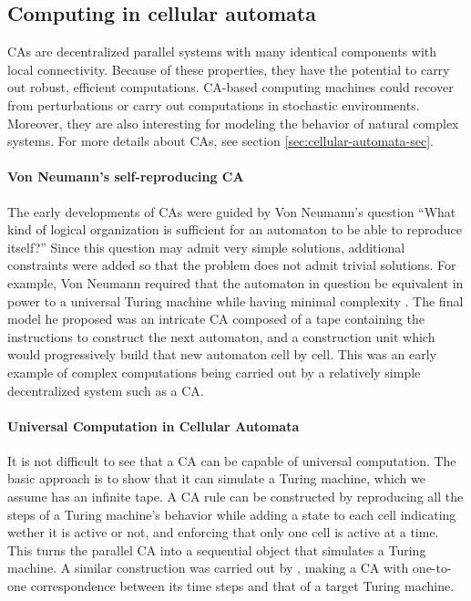 \subsection{Computing in cellular automata}\label{sec:comp-cell-autom}

\Acfp{CA} are decentralized parallel systems with many identical components with
local connectivity. Because of these properties, they have the potential to
carry out robust, efficient computations. \ac{CA}-based computing machines could
recover from perturbations or carry out computations in stochastic environments.
Moreover, they are also interesting for modeling the behavior of natural complex
systems. For more details about \acp{CA}, see section
\ref{sec:cellular-automata-sec}.

\paragraph{Von Neumann's self-reproducing \ac{CA}}
The early developments of \acp{CA} were guided by Von Neumann's question ``What
kind of logical organization is sufficient for an automaton to be able to
reproduce itself?'' Since this question may admit very simple solutions,
additional constraints were added so that the problem does not admit trivial
solutions. For example, Von Neumann required that the automaton in question be
equivalent in power to a universal Turing machine while having minimal
complexity \parencite{vonneumannTheorySelfreproducingAutomata1966}. The final
model he proposed was an intricate \ac{CA} composed of a tape containing the
instructions to construct the next automaton, and a construction unit which
would progressively build that new automaton cell by cell. This was an early
example of complex computations being carried out by a relatively simple
decentralized system such as a \ac{CA}.

\paragraph{Universal Computation in Cellular Automata}
It is not difficult to see that a \ac{CA} can be capable of universal
computation. The basic approach is to show that it can simulate a Turing
machine, which we assume has an infinite tape. A \ac{CA} rule can be constructed
by reproducing all the steps of a Turing machine's behavior while adding a state
to each cell indicating wether it is active or not, and enforcing that only one
cell is active at a time. This turns the parallel \ac{CA} into a sequential
object that simulates a Turing machine. A similar construction was carried out
by \parencite{smithSimpleComputationUniversalCellular1971}, making a \ac{CA}
with one-to-one correspondence between its time steps and that of a target
Turing machine.

